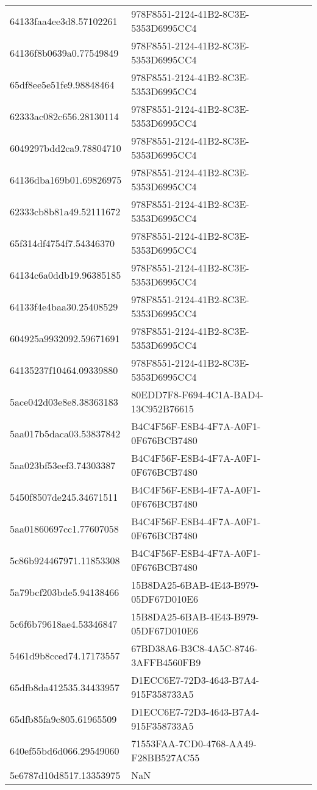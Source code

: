 \begin{tabular}{ll}
64133faa4ee3d8.57102261 & 978F8551-2124-41B2-8C3E-5353D6995CC4 \\
64136f8b0639a0.77549849 & 978F8551-2124-41B2-8C3E-5353D6995CC4 \\
65df8ee5e51fe9.98848464 & 978F8551-2124-41B2-8C3E-5353D6995CC4 \\
62333ac082c656.28130114 & 978F8551-2124-41B2-8C3E-5353D6995CC4 \\
6049297bdd2ca9.78804710 & 978F8551-2124-41B2-8C3E-5353D6995CC4 \\
64136dba169b01.69826975 & 978F8551-2124-41B2-8C3E-5353D6995CC4 \\
62333cb8b81a49.52111672 & 978F8551-2124-41B2-8C3E-5353D6995CC4 \\
65f314df4754f7.54346370 & 978F8551-2124-41B2-8C3E-5353D6995CC4 \\
64134c6a0ddb19.96385185 & 978F8551-2124-41B2-8C3E-5353D6995CC4 \\
64133f4e4baa30.25408529 & 978F8551-2124-41B2-8C3E-5353D6995CC4 \\
604925a9932092.59671691 & 978F8551-2124-41B2-8C3E-5353D6995CC4 \\
64135237f10464.09339880 & 978F8551-2124-41B2-8C3E-5353D6995CC4 \\
5ace042d03e8e8.38363183 & 80EDD7F8-F694-4C1A-BAD4-13C952B76615 \\
5aa017b5daca03.53837842 & B4C4F56F-E8B4-4F7A-A0F1-0F676BCB7480 \\
5aa023bf53eef3.74303387 & B4C4F56F-E8B4-4F7A-A0F1-0F676BCB7480 \\
5450f8507de245.34671511 & B4C4F56F-E8B4-4F7A-A0F1-0F676BCB7480 \\
5aa01860697cc1.77607058 & B4C4F56F-E8B4-4F7A-A0F1-0F676BCB7480 \\
5c86b924467971.11853308 & B4C4F56F-E8B4-4F7A-A0F1-0F676BCB7480 \\
5a79bcf203bde5.94138466 & 15B8DA25-6BAB-4E43-B979-05DF67D010E6 \\
5c6f6b79618ae4.53346847 & 15B8DA25-6BAB-4E43-B979-05DF67D010E6 \\
5461d9b8cced74.17173557 & 67BD38A6-B3C8-4A5C-8746-3AFFB4560FB9 \\
65dfb8da412535.34433957 & D1ECC6E7-72D3-4643-B7A4-915F358733A5 \\
65dfb85fa9c805.61965509 & D1ECC6E7-72D3-4643-B7A4-915F358733A5 \\
640ef55bd6d066.29549060 & 71553FAA-7CD0-4768-AA49-F28BB527AC55 \\
5e6787d10d8517.13353975 & NaN \\

\end{tabular}
